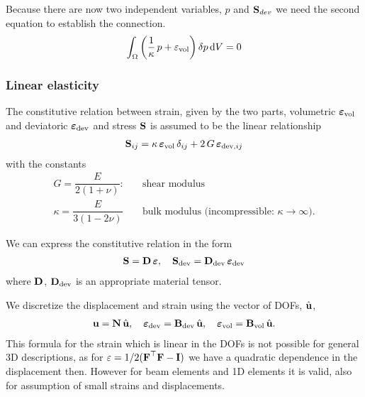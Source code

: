 Because there are now two independent variables, $p$ and $\textbf{S}_{dev}$ we need the second equation to establish the connection.
\begin{equation}\label{eq:mixed_eq2}
  \begin{array}{lll}
    \ds\int_{\Omega} \left(\dfrac1{\kappa}p + \eps_\text{vol}\right)\delta p\,\d V = 0
  \end{array}
\end{equation}

\subsubsection{Linear elasticity}

The constitutive relation between strain, given by the two parts, volumetric $\boldsymbol{\varepsilon}_\text{vol}$ and deviatoric $\boldsymbol{\varepsilon}_\text{dev}$ and stress $\textbf{S}$ is assumed to be the linear relationship
\begin{equation*}
  \begin{array}{lll}
    \textbf{S}_{ij} = \kappa\,\boldsymbol{\varepsilon}_\text{vol}\,\delta_{ij} + 2\,G\,\boldsymbol{\varepsilon}_{\text{dev},ij}
  \end{array}
\end{equation*}
with the constants
\begin{equation*}
  \begin{array}{lll}
    G = \dfrac{E}{2(1+ν)}: \quad &\text{shear modulus}\\[4mm]
    \kappa = \dfrac{E}{3(1-2ν)} \quad &\text{bulk modulus (incompressible: $κ\to\infty$).}
  \end{array}
\end{equation*}

We can express the constitutive relation in the form
\begin{equation*}
  \begin{array}{lll}
    \textbf{S} = \textbf{D}\,\boldsymbol{\varepsilon}, \quad \textbf{S}_\text{dev} = \textbf{D}_\text{dev}\,\boldsymbol{\varepsilon}_\text{dev}
  \end{array}
\end{equation*}
where $\textbf{D}$, $\textbf{D}_\text{dev}$ is an appropriate material tensor.

We discretize the displacement and strain using the vector of DOFs, $\hat{\textbf{u}}$,
\begin{equation*}
  \begin{array}{lll}
    \textbf{u} = \textbf{N}\,\hat{\textbf{u}}, \quad \boldsymbol{\varepsilon}_\text{dev}= \textbf{B}_\text{dev}\,\hat{\textbf{u}}, \quad \boldsymbol{\varepsilon}_\text{vol} = \textbf{B}_\text{vol}\,\hat{\textbf{u}}.
  \end{array}
\end{equation*}
This formula for the strain which is linear in the DOFs is not possible for general 3D descriptions, as for $\varepsilon = 1/2 (\textbf{F}^\top \textbf{F}-\textbf{I})$ we have a quadratic dependence in the displacement then. However for beam elements and 1D elements it is valid, also for assumption of small strains and displacements.

